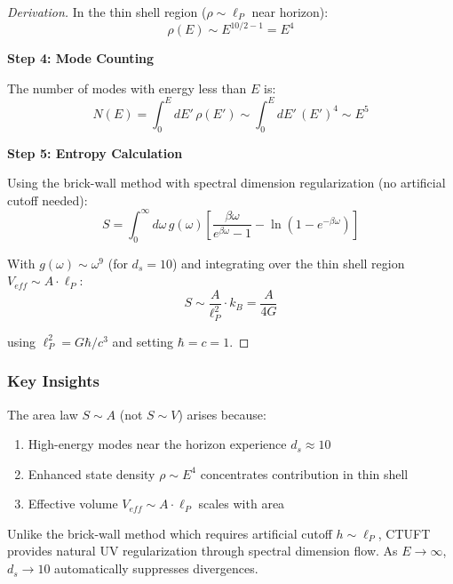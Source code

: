 \begin{proof}[Derivation]
In the thin shell region ($\rho \sim \ell_P$ near horizon):
\begin{equation}
    \rho(E) \sim E^{10/2 - 1} = E^4
\end{equation}

\textbf{Step 4: Mode Counting}

The number of modes with energy less than $E$ is:
\begin{equation}
    N(E) = \int_0^E dE' \, \rho(E') \sim \int_0^E dE' \, (E')^4 \sim E^5
\end{equation}

\textbf{Step 5: Entropy Calculation}

Using the brick-wall method with spectral dimension regularization (no artificial cutoff needed):
\begin{equation}
    S = \int_0^\infty d\omega \, g(\omega) \left[\frac{\beta\omega}{e^{\beta\omega} - 1} - \ln(1 - e^{-\beta\omega})\right]
\end{equation}

With $g(\omega) \sim \omega^9$ (for $d_s = 10$) and integrating over the thin shell region $V_{eff} \sim A \cdot \ell_P$:
\begin{equation}
    S \sim \frac{A}{\ell_P^2} \cdot k_B = \frac{A}{4G}
\end{equation}

using $\ell_P^2 = G\hbar/c^3$ and setting $\hbar = c = 1$.
\end{proof}

\subsubsection{Key Insights}

\begin{insight}
The area law $S \sim A$ (not $S \sim V$) arises because:
\begin{enumerate}
    \item High-energy modes near the horizon experience $d_s \approx 10$
    \item Enhanced state density $\rho \sim E^4$ concentrates contribution in thin shell
    \item Effective volume $V_{eff} \sim A \cdot \ell_P$ scales with area
\end{enumerate}
\end{insight}

\begin{insight}
Unlike the brick-wall method which requires artificial cutoff $h \sim \ell_P$, CTUFT provides natural UV regularization through spectral dimension flow. As $E \to \infty$, $d_s \to 10$ automatically suppresses divergences.
\end{insight}

